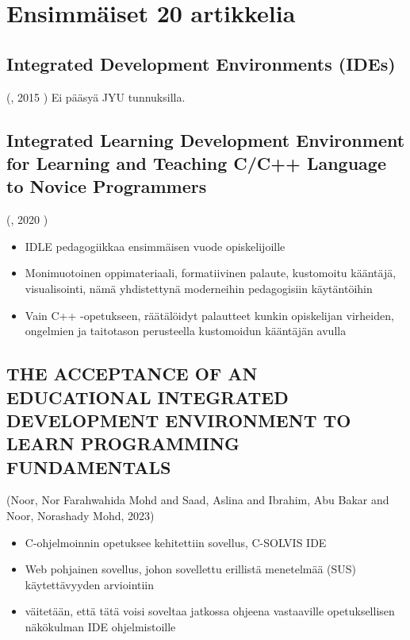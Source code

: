 \documentclass[11pt]{article}
\date{\today}
\title{}
\begin{document}
\tableofcontents


\section{Ensimmäiset 20 artikkelia}
\label{sec:org3a84383}

\subsection{Integrated Development Environments (IDEs)}
\label{sec:orga0c16fc}
(,  2015 )
Ei pääsyä JYU tunnuksilla.

\subsection{Integrated Learning Development Environment for Learning and Teaching C/C++ Language to Novice Programmers}
\label{sec:org47e3d38}
(,  2020 )

\begin{itemize}
\item IDLE pedagogiikkaa ensimmäisen vuode opiskelijoille
\item Monimuotoinen oppimateriaali, formatiivinen palaute, kustomoitu
kääntäjä, visualisointi, nämä yhdistettynä moderneihin pedagogisiin
käytäntöihin
\item Vain C++ -opetukseen, räätälöidyt palautteet kunkin opiskelijan
virheiden, ongelmien ja taitotason perusteella kustomoidun kääntäjän
avulla
\end{itemize}

\subsection{THE ACCEPTANCE OF AN EDUCATIONAL INTEGRATED DEVELOPMENT ENVIRONMENT TO LEARN PROGRAMMING FUNDAMENTALS}
\label{sec:org3b1d145}
(Noor, Nor Farahwahida Mohd and Saad, Aslina and Ibrahim, Abu Bakar and Noor, Norashady Mohd, 2023)

\begin{itemize}
\item C-ohjelmoinnin opetuksee kehitettiin sovellus, C-SOLVIS IDE
\item Web pohjainen sovellus, johon sovellettu erillistä menetelmää
(SUS) käytettävyyden arviointiin
\item väitetään, että tätä voisi soveltaa jatkossa ohjeena vastaaville
opetuksellisen näkökulman IDE ohjelmistoille
\end{itemize}
\end{document}
